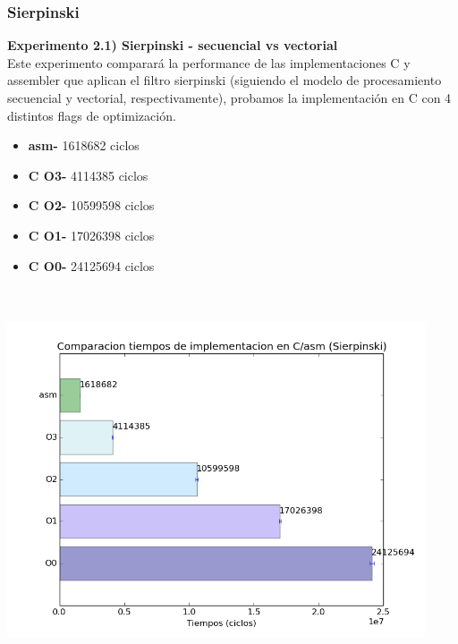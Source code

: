 \documentclass[a4paper]{article}
\begin{document}
\subsubsection{Sierpinski}

\textbf{Experimento 2.1) Sierpinski - secuencial vs vectorial}\\

Este experimento comparar\'{a} la performance de las implementaciones C y assembler que aplican el filtro sierpinski (siguiendo el modelo de procesamiento secuencial y vectorial, respectivamente), probamos la implementaci\'{o}n en C con 4 distintos flags de optimizaci\'{o}n.

\begin{itemize}


\item \textbf{asm-} 1618682 ciclos\\
\item \textbf{C O3-} 4114385  ciclos\\
\item \textbf{C O2-} 10599598 ciclos\\
\item \textbf{C O1-} 17026398 ciclos\\
\item \textbf{C O0-} 24125694 ciclos\\ \\ \\

\end{itemize}

\includegraphics[width=350pt]{imagenes/CompCasm2.png}
\end{document}
